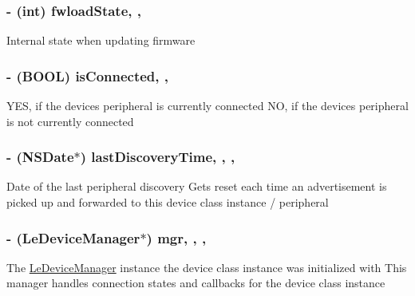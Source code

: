 \subsubsection[{fwload\+State}]{\setlength{\rightskip}{0pt plus 5cm}-\/ (int) fwload\+State\hspace{0.3cm}{\ttfamily [read]}, {\ttfamily [nonatomic]}, {\ttfamily [assign]}}\label{interface_le_device_a56486348e92a0d5807a47e306a1cecd3}
Internal state when updating firmware \hypertarget{interface_le_device_ac8c47eb882711a02628064671e821b49}{}
\subsubsection[{is\+Connected}]{\setlength{\rightskip}{0pt plus 5cm}-\/ (B\+O\+O\+L) is\+Connected\hspace{0.3cm}{\ttfamily [read]}, {\ttfamily [nonatomic]}, {\ttfamily [assign]}}\label{interface_le_device_ac8c47eb882711a02628064671e821b49}
Y\+E\+S, if the device\textquotesingle{}s peripheral is currently connected N\+O, if the device\textquotesingle{}s peripheral is not currently connected \hypertarget{interface_le_device_aea2379826199ce57353813b072bb4fe3}{}
\subsubsection[{last\+Discovery\+Time}]{\setlength{\rightskip}{0pt plus 5cm}-\/ (N\+S\+Date$\ast$) last\+Discovery\+Time\hspace{0.3cm}{\ttfamily [read]}, {\ttfamily [write]}, {\ttfamily [nonatomic]}, {\ttfamily [strong]}}\label{interface_le_device_aea2379826199ce57353813b072bb4fe3}
Date of the last peripheral discovery Gets reset each time an advertisement is picked up and forwarded to this device class instance / peripheral \hypertarget{interface_le_device_a53fa330659e8fb767bdb4eec7cff451c}{}
\subsubsection[{mgr}]{\setlength{\rightskip}{0pt plus 5cm}-\/ ({\bf Le\+Device\+Manager}$\ast$) mgr\hspace{0.3cm}{\ttfamily [read]}, {\ttfamily [write]}, {\ttfamily [nonatomic]}, {\ttfamily [assign]}}\label{interface_le_device_a53fa330659e8fb767bdb4eec7cff451c}
The \hyperlink{interface_le_device_manager}{Le\+Device\+Manager} instance the device class instance was initialized with This manager handles connection states and callbacks for the device class instance \hypertarget{interface_le_device_a0a263256daa735d19c989c6d884602a2}{}
